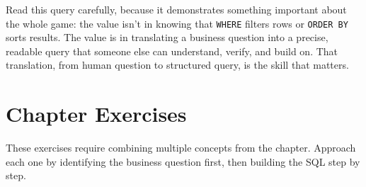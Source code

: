 \documentclass[
  letterpaper,
  DIV=11,
  numbers=noendperiod]{scrreprt}
\begin{document}
Read this query carefully, because it demonstrates something important
about the whole game: the value isn't in knowing that \texttt{WHERE}
filters rows or \texttt{ORDER\ BY} sorts results. The value is in
translating a business question into a precise, readable query that
someone else can understand, verify, and build on. That translation,
from human question to structured query, is the skill that matters.

\section{Chapter Exercises}\label{chapter-exercises-1}

These exercises require combining multiple concepts from the chapter.
Approach each one by identifying the business question first, then
building the SQL step by step.
\end{document}
